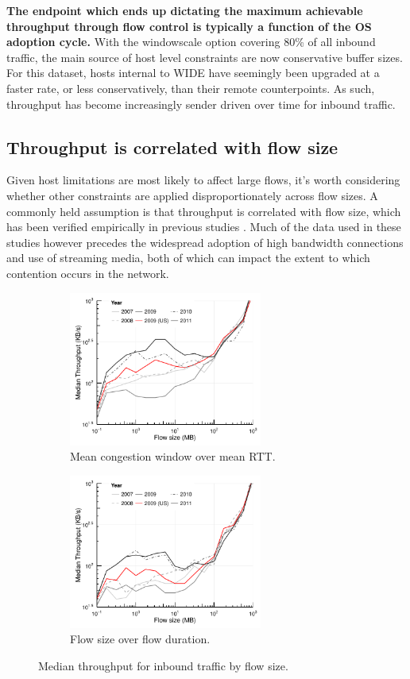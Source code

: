 \textbf{The endpoint which ends up dictating the maximum achievable throughput through flow control is typically a function of the \acs{OS} adoption cycle.}
With the windowscale option covering 80\% of all inbound traffic, the main source of host level constraints are now conservative buffer sizes.
For this dataset, hosts internal to \acs{WIDE} have seemingly been upgraded at a faster rate, or less conservatively, than their remote counterpoints.
As such, throughput has become increasingly sender driven over time for inbound traffic.

\subsection{Throughput is correlated with flow size}

Given host limitations are most likely to affect large flows, it's worth considering whether other constraints are applied disproportionately across flow sizes. 
A commonly held assumption is that throughput is correlated with flow size, which has been verified empirically in previous studies \cite{oursTCP, Zhang:2002p85}.
Much of the data used in these studies however precedes the widespread adoption of high bandwidth connections and use of streaming media, both of which can impact the extent to which contention occurs in the network.

\begin{figure}
    \begin{subfigure}[b]{.5\linewidth}
        \centering
        \includegraphics[width=2.5in]{figures/malawi/med_active_throughput}
        \caption{Mean congestion window over mean \ac{RTT}. \label{fig:flowrateactive}}
    \end{subfigure}%
    \begin{subfigure}[b]{.5\linewidth}
        \centering
        \includegraphics[width=2.5in]{figures/malawi/med_aggr_throughput}
        \caption{Flow size over flow duration.\label{fig:flowrateaggr}}
    \end{subfigure}%
    \caption{Median throughput for inbound traffic by flow size. \label{fig:flowrate}}
\end{figure}
 

